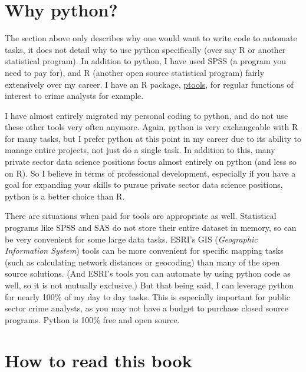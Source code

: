 \documentclass[
  letterpaper,
]{scrbook}
\begin{document}
\section*{Why python?}\label{why-python}


The section above only describes why one would want to write code to
automate tasks, it does not detail why to use python specifically (over
say R or another statistical program). In addition to python, I have
used SPSS (a program you need to pay for), and R (another open source
statistical program) fairly extensively over my career. I have an R
package, \href{https://github.com/apwheele/ptools}{ptools}, for regular
functions of interest to crime analysts for example.

I have almost entirely migrated my personal coding to python, and do not
use these other tools very often anymore. Again, python is very
exchangeable with R for many tasks, but I prefer python at this point in
my career due to its ability to manage entire projects, not just do a
single task. In addition to this, many private sector data science
positions focus almost entirely on python (and less so on R). So I
believe in terms of professional development, especially if you have a
goal for expanding your skills to pursue private sector data science
positions, python is a better choice than R.

There are situations when paid for tools are appropriate as well.
Statistical programs like SPSS and SAS do not store their entire dataset
in memory, so can be very convenient for some large data tasks. ESRI's
GIS (\emph{Geographic Information System}) tools can be more convenient
for specific mapping tasks (such as calculating network distances or
geocoding) than many of the open source solutions. (And ESRI's tools you
can automate by using python code as well, so it is not mutually
exclusive.) But that being said, I can leverage python for nearly 100\%
of my day to day tasks. This is especially important for public sector
crime analysts, as you may not have a budget to purchase closed source
programs. Python is 100\% free and open source.

\section*{How to read this book}\label{how-to-read-this-book}
\end{document}
